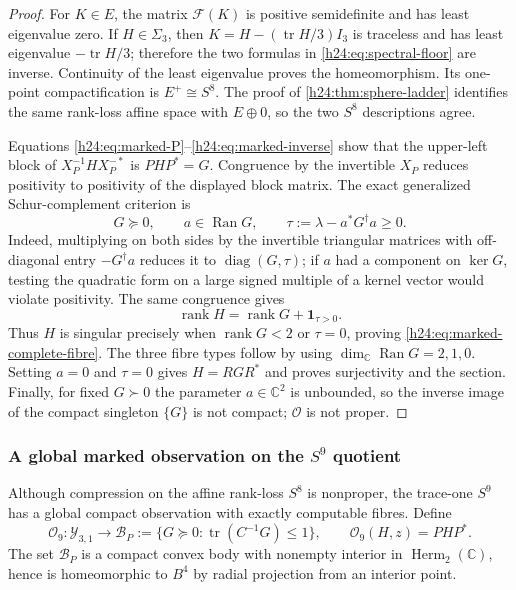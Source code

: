 \begin{proof}
For $K\in E$, the matrix $\mathcal F(K)$ is positive semidefinite and has
least eigenvalue zero.  If $H\in\Sigma_3$, then
$K=H-(\operatorname{tr} H/3)I_3$ is traceless and has least eigenvalue $-\operatorname{tr} H/3$;
therefore the two formulas in \eqref{h24:eq:spectral-floor} are inverse.
Continuity of the least eigenvalue proves the homeomorphism.  Its one-point
compactification is $E^+\cong S^8$.  The proof of
\cref{h24:thm:sphere-ladder} identifies the same rank-loss affine space with
$E\oplus0$, so the two $S^8$ descriptions agree.

Equations \eqref{h24:eq:marked-P}--\eqref{h24:eq:marked-inverse} show that the
upper-left block of $X_P^{-1}HX_P^{-*}$ is $PHP^*=G$.  Congruence by the
invertible $X_P$ reduces positivity to positivity of the displayed block
matrix.  The exact generalized Schur-complement criterion is
\[
 G\succeq0,\qquad a\in\operatorname{Ran}G,\qquad
 \tau:=\lambda-a^*G^\dagger a\ge0.
\]
Indeed, multiplying on both sides by the invertible triangular matrices
with off-diagonal entry $-G^\dagger a$ reduces it to
$\operatorname{diag}(G,\tau)$; if $a$ had a component on $\ker G$, testing the quadratic
form on a large signed multiple of a kernel vector would violate
positivity.  The same congruence gives
\[
 \operatorname{rank} H=\operatorname{rank} G+\mathbf 1_{\tau>0}.
\]
Thus $H$ is singular precisely when $\operatorname{rank} G<2$ or $\tau=0$, proving
\eqref{h24:eq:marked-complete-fibre}.  The three fibre types follow by using
$\dim_\mathbb C\operatorname{Ran}G=2,1,0$.  Setting $a=0$ and $\tau=0$ gives
$H=RGR^*$ and proves surjectivity and the section.  Finally, for fixed
$G\succ0$ the parameter $a\in\mathbb C^2$ is unbounded, so the inverse image of
the compact singleton $\{G\}$ is not compact; $\mathscr O$ is not proper.
\end{proof}

\subsubsection[A global marked observation on the S9 quotient]
{A global marked observation on the $S^9$ quotient}

Although compression on the affine rank-loss $S^8$ is nonproper, the
trace-one $S^9$ has a global compact observation with exactly computable
fibres.  Define
\begin{equation}
 \mathscr O_9:\mathcal Y_{3,1}\longrightarrow
 \mathcal B_P:=\{G\succeq0:\operatorname{tr}(C^{-1}G)\le1\},\qquad
 \mathscr O_9(H,z)=PHP^*.
 \label{h24:eq:O9}
\end{equation}
The set $\mathcal B_P$ is a compact convex body with nonempty interior in
$\operatorname{Herm}_2(\mathbb C)$, hence is homeomorphic to $B^4$ by radial projection from an
interior point.


